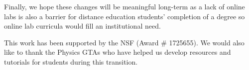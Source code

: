 \documentclass[aip, numerical, preprint]{revtex4-2}
\begin{document}
Finally, we hope these changes will be meaningful long-term as a lack of online labs is also a
barrier for distance education students' completion of a degree so online lab curricula would
fill an institutional need.


\begin{acknowledgments}
  This work has been supported by the NSF (Award \# 1725655). We would
  also like to thank the Physics GTAs who have helped us develop
  resources and tutorials for students during this transition.
\end{acknowledgments}


\end{document}
